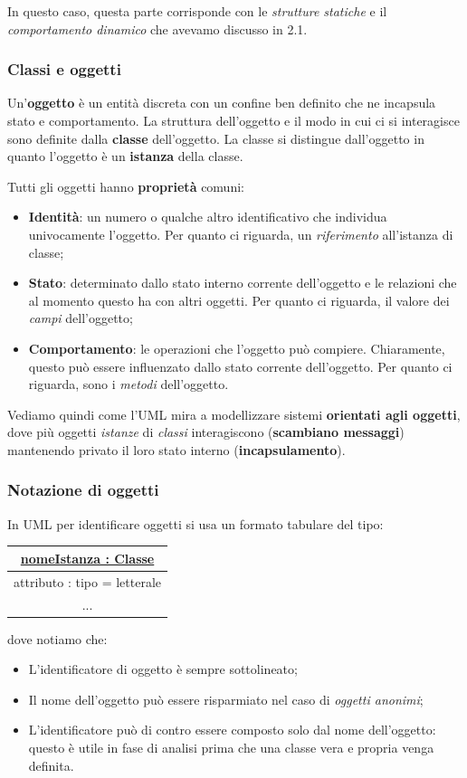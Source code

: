 \documentclass[a4paper,11pt]{article}
\begin{document}
In questo caso, questa parte corrisponde con le \textit{strutture statiche} e il \textit{comportamento dinamico} che avevamo discusso in 2.1.

\subsubsection{Classi e oggetti}
Un'\textbf{oggetto} è un entità discreta con un confine ben definito che ne incapsula stato e comportamento.
La struttura dell'oggetto e il modo	in cui ci si interagisce sono definite dalla \textbf{classe} dell'oggetto.
La classe si distingue dall'oggetto in quanto l'oggetto è un \textbf{istanza} della classe.

Tutti gli oggetti hanno \textbf{proprietà} comuni:
\begin{itemize}
	\item \textbf{Identità}: un numero o qualche altro identificativo che individua univocamente l'oggetto. Per quanto ci riguarda, un \textit{riferimento} all'istanza di classe;
	\item \textbf{Stato}: determinato dallo stato interno corrente dell'oggetto e le relazioni che al momento questo ha con altri oggetti. Per quanto ci riguarda, il valore dei \textit{campi} dell'oggetto;
	\item \textbf{Comportamento}: le operazioni che l'oggetto può compiere. Chiaramente, questo può essere influenzato dallo stato corrente dell'oggetto. Per quanto ci riguarda, sono i \textit{metodi} dell'oggetto.
\end{itemize}

Vediamo quindi come l'UML mira a modellizzare sistemi \textbf{orientati agli oggetti}, dove più oggetti \textit{istanze} di \textit{classi} interagiscono (\textbf{scambiano messaggi}) mantenendo privato il loro stato interno (\textbf{incapsulamento}).

\subsubsection{Notazione di oggetti}
In UML per identificare oggetti si usa un formato tabulare del tipo:
\begin{table}[H]
	\center 
	\begin{tabular} { | c | }
		\hline
		\underline{nomeIstanza : Classe} \\
		\hline
		attributo : tipo = letterale \\
		... \\
		\hline
	\end{tabular}
\end{table}
dove notiamo che:
\begin{itemize}
	\item L'identificatore di oggetto è sempre sottolineato;
	\item Il nome dell'oggetto può essere risparmiato nel caso di \textit{oggetti anonimi};
	\item L'identificatore può di contro essere composto solo dal nome dell'oggetto: questo è utile in fase di analisi prima che una classe vera e propria venga definita.
\end{itemize}
\end{document}

